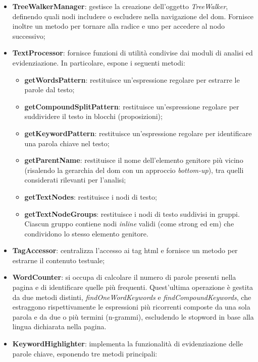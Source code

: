 \begin{itemize}
  \item \textbf{TreeWalkerManager}: gestisce la creazione dell’oggetto \textit{TreeWalker}, definendo quali nodi includere o escludere nella navigazione del \gls{dom}. Fornisce inoltre un metodo per tornare alla radice e uno per accedere al nodo successivo;
  \item \textbf{TextProcessor}: fornisce funzioni di utilità condivise dai moduli di analisi ed evidenziazione. In particolare, espone i seguenti metodi:
  \begin{itemize}
    \item \textbf{getWordsPattern}: restituisce un'espressione regolare per estrarre le parole dal testo;
    \item \textbf{getCompoundSplitPattern}: restituisce un’espressione regolare per suddividere il testo in blocchi (proposizioni);
    \item \textbf{getKeywordPattern}: restituisce un’espressione regolare per identificare una parola chiave nel testo;
    \item \textbf{getParentName}: restituisce il nome dell’elemento genitore più vicino (risalendo la gerarchia del \gls{dom} con un approccio \textit{bottom-up}), tra quelli considerati rilevanti per l’analisi;
    \item \textbf{getTextNodes}: restituisce i nodi di testo;
    \item \textbf{getTextNodeGroups}: restituisce i nodi di testo suddivisi in gruppi. Ciascun gruppo contiene nodi \textit{inline} validi (come strong ed em) che condividono lo stesso elemento genitore.
  \end{itemize}
  \item \textbf{TagAccessor}: centralizza l’accesso ai tag \gls{html} e fornisce un metodo per estrarne il contenuto testuale;
  \item \textbf{WordCounter}: si occupa di calcolare il numero di parole presenti nella pagina e di identificare quelle più frequenti. Quest’ultima operazione è gestita da due metodi distinti, \textit{findOneWordKeywords} e \textit{findCompoundKeywords}, che estraggono rispettivamente le espressioni più ricorrenti composte da una sola parola e da due o più termini (n-grammi), escludendo le \gls{stopword} in base alla lingua dichiarata nella pagina.
  \item \textbf{KeywordHighlighter}: implementa la funzionalità di evidenziazione delle parole chiave, esponendo tre metodi principali:
  \begin{itemize}

\end{itemize}
\end{itemize}
